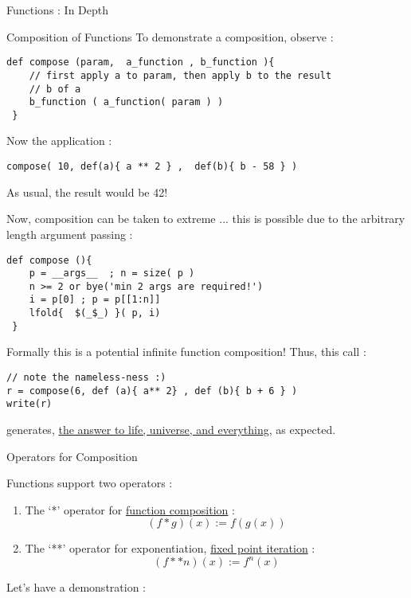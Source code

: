 \begin{section}{Functions : In Depth}
\begin{subsection}{Composition of Functions}
To demonstrate a composition, observe :

\begin{lstlisting}[style=JexlStyle]
def compose (param,  a_function , b_function ){
    // first apply a to param, then apply b to the result 
    // b of a 
    b_function ( a_function( param ) )
 }
\end{lstlisting}
 
Now the application :

\begin{lstlisting}[style=JexlStyle]
 compose( 10, def(a){ a ** 2 } ,  def(b){ b - 58 } )
\end{lstlisting}
 
As usual, the result would be 42!

Now, composition can be taken to extreme ... this is possible due to the arbitrary length argument passing :

\begin{lstlisting}[style=JexlStyle]
def compose (){
    p = __args__  ; n = size( p ) 
    n >= 2 or bye('min 2 args are required!') 
    i = p[0] ; p = p[[1:n]]
    lfold{  $(_$_) }( p, i) 
 }
\end{lstlisting}
 
Formally this is a potential infinite function composition! Thus, this call :

\begin{lstlisting}[style=JexlStyle]
// note the nameless-ness :)
r = compose(6, def (a){ a** 2} , def (b){ b + 6 } )
write(r)
\end{lstlisting}

generates, \href{https://www.google.co.in/search?client=safari&rls=en&q=the+answer+to+life,+universe,+and+everything&ie=UTF-8&oe=UTF-8&gfe\_rd=cr&ei=hHDIVsv-BsGL8QedmLnwDg}{the answer to life, universe, and everything}, as expected.

\end{subsection}

\begin{subsection}{Operators for Composition}

Functions support two operators :
\begin{enumerate}
\item{ The `*' operator for \href{https://en.wikipedia.org/wiki/Function_composition}{function composition} :
   $$
   ( f * g) ( x ) := f ( g ( x ) )  
   $$
}
\item { The `**' operator for exponentiation, 
\href{https://en.wikipedia.org/wiki/Fixed-point\_iteration}{fixed point iteration}  : 
  $$
   ( f ** n ) (x) := f^n(x)     
  $$
}
\end{enumerate}
Let's have a demonstration :


\end{subsection}
\end{section}
